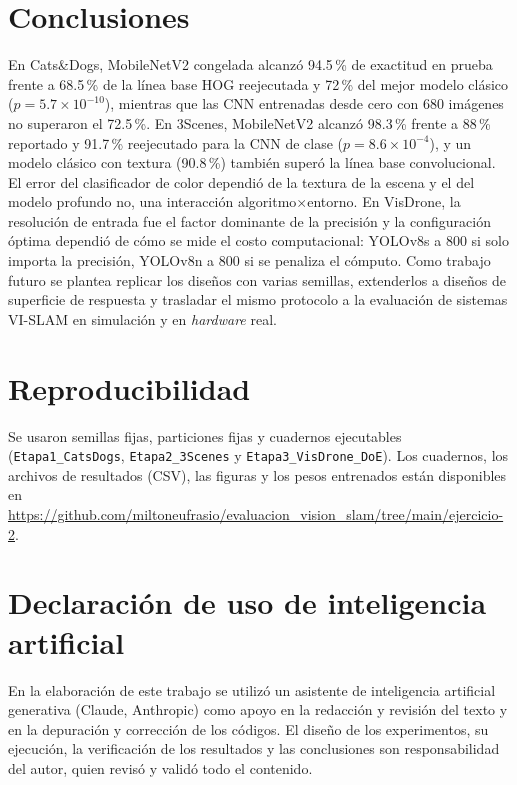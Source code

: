 \documentclass[conference]{IEEEtran}
\begin{document}
\section{Conclusiones}
En Cats\&Dogs, MobileNetV2 congelada alcanzó 94.5\,\% de exactitud en prueba frente a 68.5\,\% de la línea base HOG reejecutada y 72\,\% del mejor modelo clásico ($p=5.7\times10^{-10}$), mientras que las CNN entrenadas desde cero con 680 imágenes no superaron el 72.5\,\%. En 3Scenes, MobileNetV2 alcanzó 98.3\,\% frente a 88\,\% reportado y 91.7\,\% reejecutado para la CNN de clase ($p=8.6\times10^{-4}$), y un modelo clásico con textura (90.8\,\%) también superó la línea base convolucional. El error del clasificador de color dependió de la textura de la escena y el del modelo profundo no, una interacción algoritmo$\times$entorno. En VisDrone, la resolución de entrada fue el factor dominante de la precisión y la configuración óptima dependió de cómo se mide el costo computacional: YOLOv8s a 800 si solo importa la precisión, YOLOv8n a 800 si se penaliza el cómputo. Como trabajo futuro se plantea replicar los diseños con varias semillas, extenderlos a diseños de superficie de respuesta y trasladar el mismo protocolo a la evaluación de sistemas VI-SLAM en simulación y en \emph{hardware} real.

\section*{Reproducibilidad}
Se usaron semillas fijas, particiones fijas y cuadernos ejecutables (\texttt{Etapa1\_CatsDogs}, \texttt{Etapa2\_3Scenes} y \texttt{Etapa3\_VisDrone\_DoE}). Los cuadernos, los archivos de resultados (CSV), las figuras y los pesos entrenados están disponibles en \url{https://github.com/miltoneufrasio/evaluacion_vision_slam/tree/main/ejercicio-2}.

\section*{Declaración de uso de inteligencia artificial}
En la elaboración de este trabajo se utilizó un asistente de inteligencia artificial generativa (Claude, Anthropic) como apoyo en la redacción y revisión del texto y en la depuración y corrección de los códigos. El diseño de los experimentos, su ejecución, la verificación de los resultados y las conclusiones son responsabilidad del autor, quien revisó y validó todo el contenido.
\end{document}
